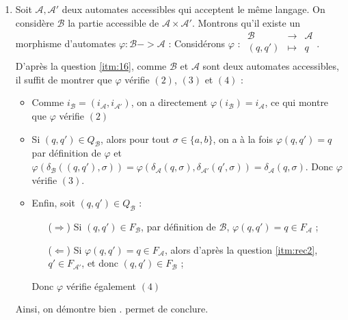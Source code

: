 \documentclass{article}
\begin{document}
\begin{enumerate}
    \item Soit $\mathcal{A}, \mathcal{A}'$ deux automates accessibles qui acceptent le même langage. On considère $\mathcal{B}$ la partie accessible de $\mathcal{A} \times \mathcal{A'}$. \newline
    Montrons qu'il existe un morphisme d'automates $\varphi : \mathcal{B} -> \mathcal{A}$ : \newline
    Considérons $\varphi$ : $\begin{array}{ccc}
        \mathcal{B} & \to & \mathcal{A} \\
        (q, q') & \mapsto & q \\
        \end{array}$. \newline
    D'après la question \ref{itm:16}, comme $\mathcal{B}$ et $\mathcal{A}$ sont deux automates accessibles, il suffit de montrer que $\varphi$ vérifie $(2)$, $(3)$ et $(4)$ :
    \begin{itemize}
        \item Comme $i_\mathcal{B} = (i_\mathcal{A}, i_\mathcal{A'})$, on a directement $\varphi(i_\mathcal{B}) = i_\mathcal{A}$, ce qui montre que $\varphi$ vérifie $(2)$
        \item Si $(q, q') \in Q_\mathcal{B}$, alors pour tout $\sigma \in \{a, b \}$, on a à la fois $\varphi(q, q') = q$ par définition de $\varphi$ et $\varphi(\delta_\mathcal{B}((q, q'), \sigma)) = \varphi(\delta_\mathcal{A}(q, \sigma), \delta_\mathcal{A'}(q', \sigma)) = \delta_\mathcal{A}(q, \sigma)$. Donc $\varphi$ vérifie $(3)$.
        \item Enfin, soit $(q, q') \in Q_\mathcal{B}$ : 
            \begin{itemize}
                \item[($\Rightarrow$)] Si $(q, q') \in F_\mathcal{B}$, par définition de $\mathcal{B}$, $\varphi(q, q') = q \in F_\mathcal{A}$ ;
                \item[($\Leftarrow$)] Si $\varphi(q, q') = q \in F_\mathcal{A}$, alors d'après la question \ref{itm:rec2}, $q' \in F_\mathcal{A'}$, et donc $(q, q') \in F_\mathcal{B}$ ; 
            \end{itemize}
            Donc $\varphi$ vérifie également $(4)$
    \end{itemize}
    Ainsi, on démontre bien . \newline
     permet de conclure.
\end{enumerate}
\end{document}
